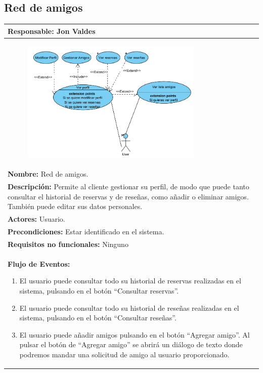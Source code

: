 \documentclass{report}
\begin{document}
        \subsection{Red de amigos}
        \begin{center}
            \begin{longtable}{|p{\linewidth}|}
                \hline
                \textbf{Responsable:} Jon Valdes\\
                \hline
                \begin{figure}[H]
                    \centering
                    \includegraphics[width=0.8\textwidth]{./img/casos_uso/RedDeAmigos.png}
                \end{figure}\\
                \hline
                \textbf{Nombre:} Red de amigos.\\
                \hline
                \textbf{Descripción:} Permite al cliente gestionar su perfil, de modo que puede tanto consultar el historial de reservas y de reseñas, como añadir o eliminar amigos. También puede editar sus datos personales.\\
                \hline
                \textbf{Actores:} Usuario.\\
                \hline
                \textbf{Precondiciones:} Estar identificado en el sistema.\\
                \hline
                \textbf{Requisitos no funcionales:} Ninguno\\
                \hline
                \textbf{Flujo de Eventos:}
                \begin{enumerate}
                    \item El usuario puede consultar todo su historial de reservas realizadas en el sistema, pulsando en el botón “Consultar reservas”.
                    \item El usuario puede consultar todo su historial de reseñas realizadas en el sistema, pulsando en el botón “Consultar reseñas”.
                    \item El usuario puede añadir amigos pulsando en el botón “Agregar amigo”. Al pulsar el botón de “Agregar amigo” se abrirá un diálogo de texto donde podremos mandar una solicitud de amigo al usuario proporcionado.


\end{enumerate}
\end{longtable}
\end{center}
\end{document}
